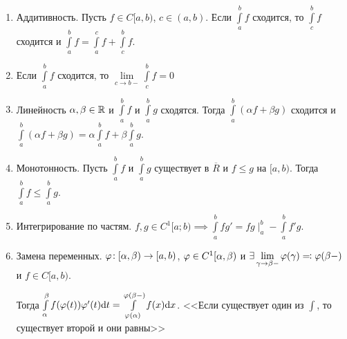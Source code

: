 \begin{properties}
    \begin{enumerate}
        \item Аддитивность. Пусть $f \in C[a, b)$,  $c \in (a, b)$. Если  $\int\limits_a^b f$ сходится, то  $\int\limits_c^b f$ сходится и  $\int\limits_a^b f = \int\limits_a^c f + \int\limits_c^b f$.
        \item Если $\int\limits_a^b f$ сходится, то  $\lim\limits_{c \to b-} \int\limits_c^b f = 0$
        \item Линейность $\alpha, \beta \in \mathbb{R}$ и $\int\limits_a^b f$ и  $\int\limits_a^b g$ сходятся. Тогда  $\int\limits_a^b(\alpha f + \beta g)$ сходится и $\int\limits_a^b (\alpha f + \beta g) = \alpha \int\limits_a^b f + \beta\int\limits_a^b g$.
        \item Монотонность. Пусть $\int\limits_a^b f$ и $\int\limits_a^b g$ существует в  $\overline{R}$ и  $f \le g$ на $[a, b)$. Тогда  $\int\limits_a^b f \le \int\limits_a^b g$.
        \item Интегрирование по частям. $f, g \in C^1[a; b) \implies \int\limits_a^b fg' = fg \mid_a^b - \int\limits_a^b f'g$.
        \item Замена переменных. $\varphi\!: [\alpha, \beta) \to [a, b)$,  $\varphi \in C^1[\alpha, \beta)$ и $\exists \lim\limits_{\gamma \to \beta-} \varphi(\gamma) \eqqcolon \varphi(\beta-)$ и $f \in C[a, b)$.

            Тогда  $\int\limits_\alpha^\beta f(\varphi(t)) \varphi'(t)\mathrm{d}t = \int\limits_{\varphi(\alpha)}^{\varphi(\beta-)} f(x) \mathrm{d}x$. <<Если существует один из  $\int$, то существует второй и они равны>>
    \end{enumerate}
\end{properties}
